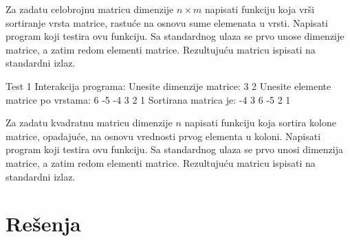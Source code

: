 \begin{Exercise}[label=526]
  Za zadatu celobrojnu matricu dimenzije $n \times m$ napisati
  funkciju koja vrši sortiranje vrsta matrice, rastuće na osnovu sume
  elemenata u vrsti. Napisati program koji testira ovu funkciju. Sa
  standardnog ulaza se prvo unose dimenzije matrice, a zatim redom
  elementi matrice. Rezultujuću matricu ispisati na standardni izlaz.

\begin{maxitest}
\begin{test}{Test 1}
Interakcija programa:    
  Unesite dimenzije matrice: 3 2
  Unesite elemente matrice po vrstama:
  6 -5
  -4 3
  2 1
  Sortirana matrica je:
  -4 3 
  6 -5 
  2 1   
\end{test}
\end{maxitest}
\end{Exercise}
\begin{Answer}[ref=526]
\end{Answer}
\begin{Exercise}[label=343]
  Za zadatu kvadratnu matricu dimenzije $n$ napisati funkciju koja
  sortira kolone matrice, opadajuće, na osnovu vrednosti prvog
  elementa u koloni.  Napisati program koji testira ovu funkciju. Sa
  standardnog ulaza se prvo unosi dimenzija matrice, a zatim redom
  elementi matrice.  Rezultujuću matricu ispisati na standardni izlaz.
\end{Exercise}


\section{Rešenja}
\shipoutAnswer


